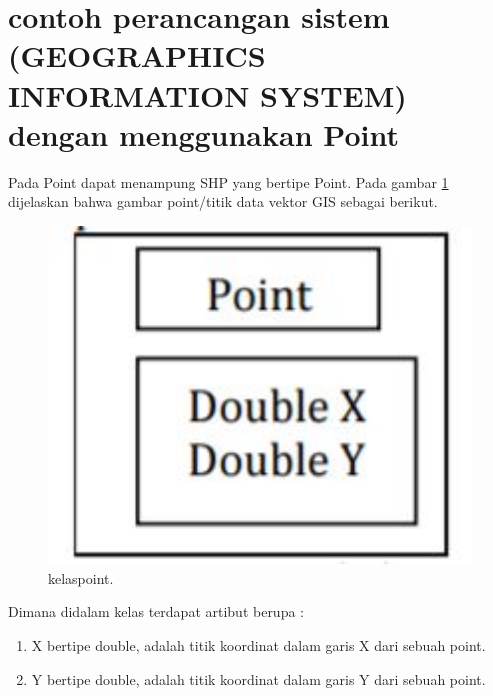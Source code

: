 \section{contoh perancangan sistem (GEOGRAPHICS INFORMATION SYSTEM) dengan menggunakan Point}
Pada Point dapat menampung SHP yang bertipe Point.
Pada gambar \ref{kelaspoint} dijelaskan bahwa gambar point/titik data vektor GIS sebagai berikut.
\begin{figure}[ht]
	\centerline{\includegraphics[width=1\textwidth]{figures/kelaspoint.JPG}}
	\caption{kelaspoint.}
	\label{kelaspoint}
	\end{figure}
Dimana didalam kelas terdapat artibut berupa :
\begin{enumerate}
\item X bertipe double, adalah titik koordinat dalam garis X dari sebuah point.
\item Y bertipe double, adalah titik koordinat dalam garis Y dari sebuah point.
\end{enumerate}

